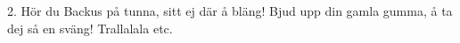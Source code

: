 2. Hör du Backus på tunna, sitt ej där å bläng!
   Bjud upp din gamla gumma, å ta dej så en sväng!
   Trallalala etc.

